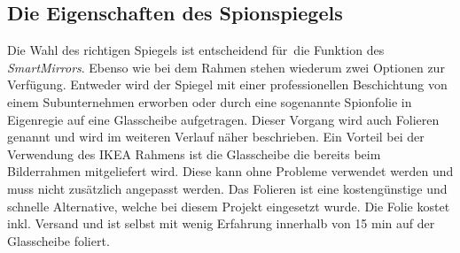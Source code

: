 \subsection{Die Eigenschaften des Spionspiegels}
Die Wahl des richtigen Spiegels ist entscheidend für die Funktion des \textit{SmartMirrors}. Ebenso wie bei dem Rahmen stehen wiederum zwei Optionen zur Verfügung. Entweder wird der Spiegel mit einer professionellen Beschichtung von einem Subunternehmen erworben oder durch eine sogenannte Spionfolie in Eigenregie auf eine Glasscheibe aufgetragen. Dieser Vorgang wird auch Folieren genannt und wird im weiteren Verlauf näher beschrieben. Ein Vorteil bei der Verwendung des IKEA Rahmens ist die Glasscheibe die bereits beim Bilderrahmen mitgeliefert wird. Diese kann ohne Probleme verwendet werden und muss nicht zusätzlich angepasst werden. Das Folieren ist eine kostengünstige und schnelle Alternative, welche bei diesem Projekt eingesetzt wurde. Die Folie kostet  inkl. Versand und ist selbst mit wenig Erfahrung innerhalb von 15 min auf der Glasscheibe foliert.

